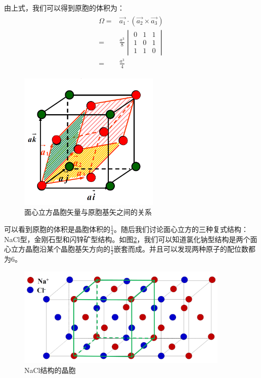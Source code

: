 \documentclass{ctexart}
\begin{document}
    由上式，我们可以得到原胞的体积为：
    \begin{align}
        \begin{split}
            \Omega=&\Vec{a_1}\cdot(\Vec{a_2}\times\Vec{a_3})\\
            =& \frac{a^3}{8}\begin{vmatrix}
            0&1&1\\
            1&0&1\\
            1&1&0
            \end{vmatrix}\\
            =&\frac{a^3}{4}
        \end{split}
    \end{align}
    
    \begin{figure}[H]
        \centering
        \includegraphics[width=0.6\textwidth]{figure/fcc.png}
        \caption{面心立方晶胞矢量与原胞基矢之间的关系}
        \label{fig:fcc}
    \end{figure}
    可以看到原胞的体积是晶胞体积的$\frac{1}{4}$。随后我们讨论面心立方的三种复式结构：NaCl型，金刚石型和闪锌矿型结构。如图\ref{fig:NaCl}，我们可以知道氯化钠型结构是两个面心立方晶胞沿某个晶胞基矢方向的$\frac{1}{2}$嵌套而成。并且可以发现两种原子的配位数都为6。
    \begin{figure}[H]
        \centering
        \includegraphics[width=0.9\textwidth]{figure/fcc_NaCl.png}
        \caption{NaCl结构的晶胞}
        \label{fig:NaCl}
    \end{figure}
    
\end{document}
